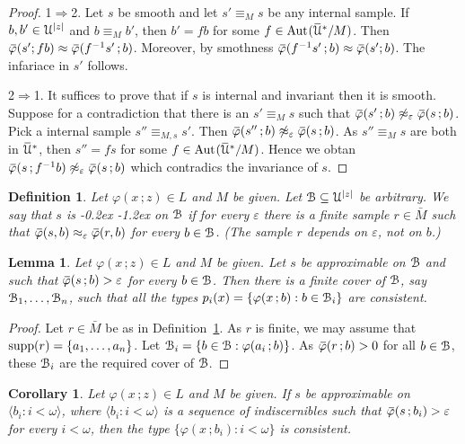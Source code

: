 \documentclass[10pt,openany]{article}
\def\supp{\mathop{\rm supp}}
\def\Aut{\textrm{Aut\kern.15ex}}
\newcommand{\sbar}[1]{\mkern 3mu\overline{\mkern-3mu#1\mkern-1mu}\mkern 1mu}
\newcommand{\barU}{\mkern 2mu\overline{\mkern-2mu\U\mkern-2mu}\mkern 2mu}
\def\IMP{\Rightarrow}
\def\U{\EuScript U}
\def\B{\EuScript B}
\def\<{\langle}
\def\>{\rangle}
\def\phi{\varphi}
\def\epsilon{\varepsilon}
\def\ssf#1{\textsf{\small #1}}
\newcounter{thm}[section]
\theoremstyle{mio}
\newtheorem{corollary}[thm]{Corollary}
\newtheorem{lemma}[thm]{Lemma}
\newtheorem{definition}[thm]{Definition}
\theoremstyle{liscio}
\def\QED{\noindent\nolinebreak[4]\hspace{\stretch{1}}\rlap{\ \ $\Box$}\medskip}
\renewcommand*{\emph}[1]{%
   \kern-0.2ex 
   \smash{\tikz[baseline]
   \node[ rectangle, fill=emphcolor, rounded corners, 
          inner xsep=.3ex, inner ysep=.2ex, anchor=base,
          minimum height = 3ex
         ]{#1};
   }
   \kern-1.2ex 
}
\begin{document}
\begin{proof}
  \ssf{1}$\IMP$\ssf{2}.
  Let $s$ be smooth and let $s'\equiv_Ms$ be any internal sample.
  If $b,b'\in\U^{|z|}$ and $b\equiv_Mb'$, then $b'=fb$ for some $f\in\Aut(\barU^*/M)$.
  Then $\sbar\phi(s';fb)\approx\sbar\phi(f^{-1}s'\,;b)$.
  Moreover, by smothness $\sbar\phi(f^{-1}s'\,;b)\approx\sbar\phi(s';b)$. The infariace in $s'$ follows.

  \ssf{2}$\IMP$\ssf{1}.
  It suffices to prove that if $s$ is internal and invariant then it is smooth.
  Suppose for a contradiction that there is an $s'\equiv_Ms$ such that $\sbar\phi(s'\,;b)\not\approx_\epsilon\sbar\phi(s\,;b)$.
  Pick a internal sample $s''\equiv_{M,s}s'$.
  Then $\sbar\phi(s''\,;b)\not\approx_\epsilon\sbar\phi(s\,;b)$.
  As $s''\equiv_Ms$ are both in $\barU^*$, then $s''=fs$ for some $f\in\Aut(\barU^*/M)$.
  Hence we obtan $\sbar\phi(s\,;f^{-1}b)\not\approx_\epsilon\sbar\phi(s\,;b)$ which contradics the invariance of $s$.
\end{proof}


\begin{definition}\label{def_approximable_sample}
  Let $\phi(x\,;z)\in L$ and $M$ be given.
  Let $\B\subseteq\U^{|z|}$ be arbitrary.
  We say that $s$ is \emph{(uniformly) approximable\/} on $\B$ if for every $\epsilon$ there is a finite sample $r\in \bar M$ such that $\sbar\phi(s,b)\approx_\epsilon\sbar\phi(r,b)$ for every $b\in\B$. (The sample $r$ depends on $\epsilon$, not on $b$.)\QED
\end{definition}

\begin{lemma}\label{lem_cons}
  Let $\phi(x\,;z)\in L$ and $M$ be given.
  Let $s$ be approximable on $\B$ and such that $\sbar\phi(s\,;b)>\epsilon$ for every $b\in\B$. Then there is a finite cover of $\B$, say $\B_1,\dots,\B_n$, such that all the types $p_i(x)=\{\phi(x\,;b):b\in\B_i\}$ are consistent.
\end{lemma}

\begin{proof}
  Let $r\in \bar M$ be as in Definition~\ref{def_approximable_sample}.
  As $r$ is finite, we may assume that $\supp(r)=\{a_1,\dots,a_n\}$.
  Let $\B_i=\{b\in\B:\phi(a_i\,;b)\}$.
  As $\sbar\phi(r\,;b)>0$ for all $b\in\B$, these $\B_i$ are the required cover of $\B$.
\end{proof}

\begin{corollary}
  Let $\phi(x\,;z)\in L$ and $M$ be given.
  If $s$ be approximable on $\<b_i:i<\omega\>$, where $\<b_i:i<\omega\>$ is a sequence of indiscernibles such that $\sbar\phi(s\,;b_i)>\epsilon$ for every $i<\omega$, then the type $\{\phi(x\,;b_i):i<\omega\}$ is consistent.\QED
\end{corollary}
\end{document}
